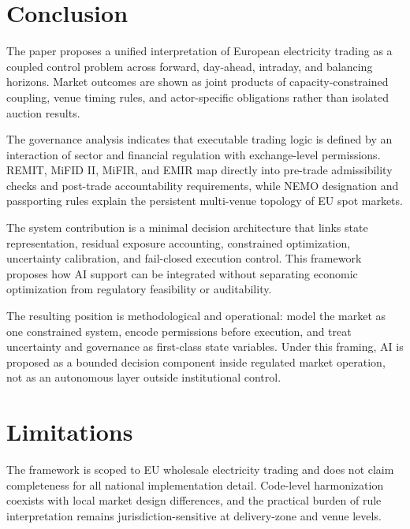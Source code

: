 \documentclass[oneside,10pt]{swissi}
\begin{document}
\section{Conclusion}
The paper proposes a unified interpretation of European electricity trading as a coupled control problem across forward, day-ahead, intraday, and balancing horizons. Market outcomes are shown as joint products of capacity-constrained coupling, venue timing rules, and actor-specific obligations rather than isolated auction results.\cite{eu_reg_2019_943,ec_network_codes_2026,acer_market_coupling_development_2026}

The governance analysis indicates that executable trading logic is defined by an interaction of sector and financial regulation with exchange-level permissions. REMIT, MiFID II, MiFIR, and EMIR map directly into pre-trade admissibility checks and post-trade accountability requirements, while NEMO designation and passporting rules explain the persistent multi-venue topology of EU spot markets.\cite{eu_reg_2011_1227_remit,eu_dir_2014_65_mifid2,eu_reg_2014_600_mifir,eu_reg_2012_648_emir,acer_nemo_designation_2026,acer_nemo_list_jan_2026}

The system contribution is a minimal decision architecture that links state representation, residual exposure accounting, constrained optimization, uncertainty calibration, and fail-closed execution control. This framework proposes how AI support can be integrated without separating economic optimization from regulatory feasibility or auditability.\cite{rockafellar_uryasev_2000_cvar,angelopoulos_bates_2021_conformal,nist_ai_rmf_2023,eu_reg_2024_1689_ai_act}

The resulting position is methodological and operational: model the market as one constrained system, encode permissions before execution, and treat uncertainty and governance as first-class state variables. Under this framing, AI is proposed as a bounded decision component inside regulated market operation, not as an autonomous layer outside institutional control.

\section{Limitations}
The framework is scoped to EU wholesale electricity trading and does not claim completeness for all national implementation detail. Code-level harmonization coexists with local market design differences, and the practical burden of rule interpretation remains jurisdiction-sensitive at delivery-zone and venue levels.\cite{acer_nemo_list_jan_2026,ec_network_codes_2026}
\end{document}
